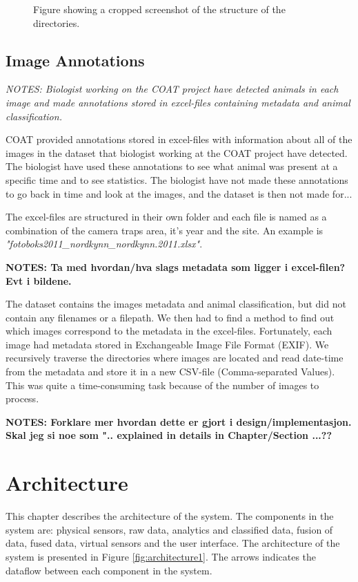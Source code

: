 \documentclass[USenglish]{uit-thesis}
\begin{document}
\begin{figure}
\caption{Figure showing a cropped screenshot of the structure of the directories.}
\label{fig:directories}
\end{figure}

\section{Image Annotations}
\textit{NOTES: Biologist working on the COAT project have detected animals in each image and made annotations stored in excel-files containing metadata and animal classification.}

COAT provided annotations stored in excel-files with information about all of the images in the dataset that biologist working at the COAT project have detected. The biologist have used these annotations to see what animal was present at a specific time and to see statistics. The biologist have not made these annotations to go back in time and look at the images, and the dataset is then not made for...

 
The excel-files are structured in their own folder and each file is named as a combination of the camera traps area, it's year and the site. An example is \textit{"fotoboks2011\_nordkynn\_nordkynn.2011.xlsx"}.

\textbf{NOTES: Ta med hvordan/hva slags metadata som ligger i excel-filen? Evt i bildene.}

The dataset contains the images metadata and animal classification, but did not contain any filenames or a filepath. We then had to find a method to find out which images correspond to the metadata in the excel-files. Fortunately, each image had metadata stored in Exchangeable Image File Format (EXIF). We recursively traverse the directories where images are located and read date-time from the metadata and store it in a new CSV-file (Comma-separated Values).
This was quite a time-consuming task because of the number of images to process.

\textbf{NOTES: Forklare mer hvordan dette er gjort i design/implementasjon. Skal jeg si noe som ".. explained in details in Chapter/Section ...??}



\chapter{Architecture}
This chapter describes the architecture of the system.
The components in the system are: physical sensors, raw data, analytics and classified data, fusion of data, fused data, virtual sensors and the user interface. 
The architecture of the system is presented in Figure \ref{fig:architecture1}. The arrows indicates the dataflow between each component in the system.
\end{document}
